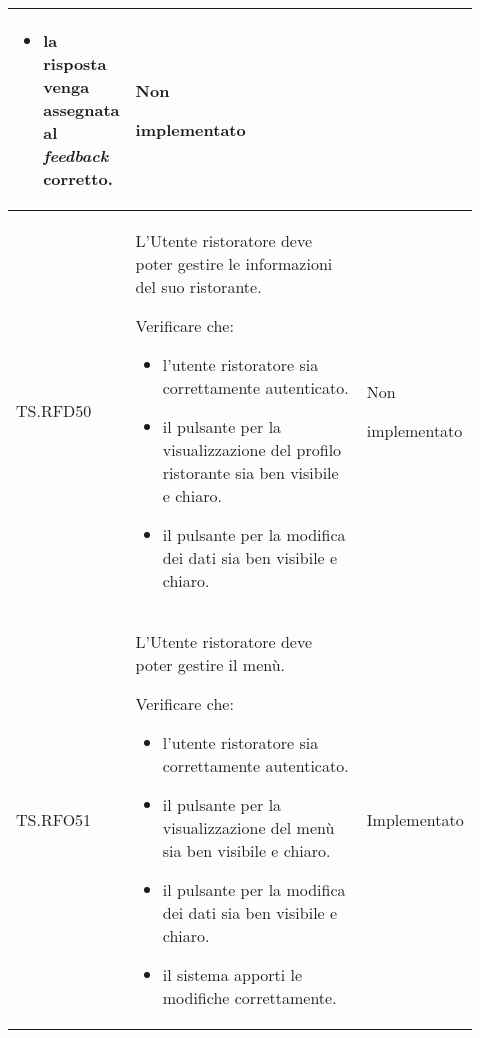 \begin{longtable}{|p{0.10\linewidth}|p{0.70\linewidth}|p{0.12\linewidth}|}
\begin{itemize}
		\item la risposta venga assegnata al \textit{feedback} corretto.
	\end{itemize}
	                                                                                                                                &
	Non \par implementato                                                                                                                                                   \\
	\hline
	TS.RFD50                                                                                                                        &
	L'Utente ristoratore deve poter gestire le informazioni del suo ristorante. \par
	Verificare che:
	\begin{itemize}
		\item l'utente ristoratore sia correttamente autenticato.
		\item il pulsante per la visualizzazione del profilo ristorante sia ben visibile e chiaro.
		\item il pulsante per la modifica dei dati sia ben visibile e chiaro.
	\end{itemize}                                      &
	Non \par implementato                                                                                                                                                   \\
	\hline
	TS.RFO51                                                                                                                        &
	L'Utente ristoratore deve poter gestire il menù. \par
	Verificare che:
	\begin{itemize}
		\item l'utente ristoratore sia correttamente autenticato.
		\item il pulsante per la visualizzazione del menù sia ben visibile e chiaro.
		\item il pulsante per la modifica dei dati sia ben visibile e chiaro.
		\item il sistema apporti le modifiche correttamente.
	\end{itemize}                                                    &
	Implementato                                                                                                                                                            \\

\end{longtable}
